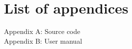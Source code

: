 \documentclass[12pt,a4paper,oneside]{book}
\begin{document}
\backmatter


\vfill\eject 

\nocite{*}



\chapter*{List of appendices}

\noindent Appendix A: Source code \\
\noindent Appendix B: User manual

\end{document}

